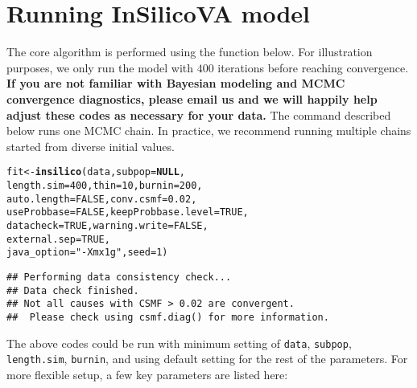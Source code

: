 \documentclass{article}\usepackage[]{graphicx}\usepackage[]{color}
\makeatletter
\newcommand{\hlnum}[1]{\textcolor[rgb]{0.686,0.059,0.569}{#1}}%
\newcommand{\hlstr}[1]{\textcolor[rgb]{0.192,0.494,0.8}{#1}}%
\newcommand{\hlstd}[1]{\textcolor[rgb]{0.345,0.345,0.345}{#1}}%
\newcommand{\hlkwa}[1]{\textcolor[rgb]{0.161,0.373,0.58}{\textbf{#1}}}%
\newcommand{\hlkwb}[1]{\textcolor[rgb]{0.69,0.353,0.396}{#1}}%
\newcommand{\hlkwc}[1]{\textcolor[rgb]{0.333,0.667,0.333}{#1}}%
\newcommand{\hlkwd}[1]{\textcolor[rgb]{0.737,0.353,0.396}{\textbf{#1}}}%
\newenvironment{kframe}{%
 \def\at@end@of@kframe{}%
 \ifinner\ifhmode%
  \def\at@end@of@kframe{\end{minipage}}%
  \begin{minipage}{\columnwidth}%
 \fi\fi%
 \def\FrameCommand##1{\hskip\@totalleftmargin \hskip-\fboxsep
 \colorbox{shadecolor}{##1}\hskip-\fboxsep
     \hskip-\linewidth \hskip-\@totalleftmargin \hskip\columnwidth}%
 \MakeFramed {\advance\hsize-\width
   \@totalleftmargin\z@ \linewidth\hsize
   \@setminipage}}%
 {\par\unskip\endMakeFramed%
 \at@end@of@kframe}
\newenvironment{knitrout}{}{} %
\newcommand\code{\bgroup\@makeother\_\@makeother\~\@makeother\$\@codex}
\def\@codex#1{{\normalfont\ttfamily\hyphenchar\font=-1 #1}\egroup}
\let\code=\texttt
\makeatother
\begin{document}
\section{Running InSilicoVA model}

The core algorithm is performed using the function below. For illustration purposes, we only run the model with $400$ iterations before reaching convergence.  {\bf If you are not familiar with Bayesian modeling and MCMC convergence diagnostics, please email us and we will happily help adjust these codes as necessary for your data.}  The command described below runs one MCMC chain.  In practice, we recommend running multiple chains started from diverse initial values.  

\begin{knitrout}
\color{fgcolor}\begin{kframe}
\begin{alltt}
\hlstd{fit}\hlkwb{<-} \hlkwd{insilico}\hlstd{( data,} \hlkwc{subpop} \hlstd{=} \hlkwa{NULL}\hlstd{,}
  \hlkwc{length.sim} \hlstd{=} \hlnum{400}\hlstd{,} \hlkwc{thin} \hlstd{=} \hlnum{10}\hlstd{,} \hlkwc{burnin} \hlstd{=} \hlnum{200}\hlstd{,}
  \hlkwc{auto.length} \hlstd{=} \hlnum{FALSE}\hlstd{,} \hlkwc{conv.csmf} \hlstd{=} \hlnum{0.02}\hlstd{,}
  \hlkwc{useProbbase} \hlstd{=} \hlnum{FALSE}\hlstd{,} \hlkwc{keepProbbase.level} \hlstd{=} \hlnum{TRUE}\hlstd{,}
  \hlkwc{datacheck} \hlstd{=} \hlnum{TRUE}\hlstd{,} \hlkwc{warning.write} \hlstd{=} \hlnum{FALSE}\hlstd{,}
  \hlkwc{external.sep} \hlstd{=} \hlnum{TRUE}\hlstd{,}
  \hlkwc{java_option} \hlstd{=} \hlstr{"-Xmx1g"}\hlstd{,} \hlkwc{seed} \hlstd{=} \hlnum{1}\hlstd{)}
\end{alltt}
\begin{verbatim}
## Performing data consistency check...
## Data check finished.
## Not all causes with CSMF > 0.02 are convergent.
##  Please check using csmf.diag() for more information.
\end{verbatim}
\end{kframe}
\end{knitrout}


The above codes could be run with minimum setting of \code{data}, \code{subpop}, \code{length.sim}, \code{burnin}, and using default setting for the rest of the parameters. For more flexible setup, a few key parameters are listed here:
\end{document}
